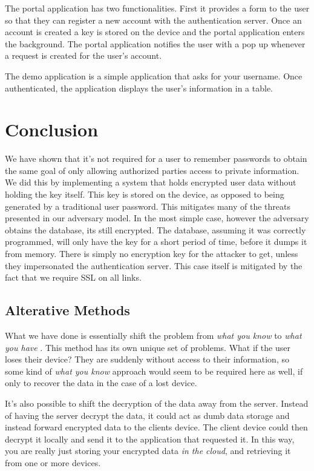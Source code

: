 \documentclass[letterpaper,twocolumn,10pt]{article}
\begin{document}
The portal application has two functionalities. First it provides a form to the user so that they can register a new account with the authentication server. Once an account is created a key is stored on the device and the portal application enters the background. The portal application notifies the user with a pop up whenever a request is created for the user's account.

The demo application is a simple application that asks for your username. Once authenticated, the application displays the user's information in a table. 


\section{Conclusion}
    We have shown that it's not required for a user to remember passwords to obtain the same goal of only allowing authorized parties access to private information. We did this by implementing a system that holds encrypted user data without holding the key itself. This key is stored on the device, as opposed to being generated by a traditional user password. This mitigates many of the threats presented in our adversary model. In the most simple case, however the adversary obtains the database, its still encrypted. The database, assuming it was correctly programmed, will only have the key for a short period of time, before it dumps it from memory. There is simply no encryption key for the attacker to get, unless they impersonated the authentication server. This case itself is mitigated by the fact that we require SSL on all links.

\subsection{Alterative Methods}

What we have done is essentially shift the problem from \textit{what you know} to \textit{what you have} \cite[Chapter~9]{privcomm}. This method has its own unique set of problems. What if the user loses their device? They are suddenly without access to their information, so some kind of \textit{what you know} approach would seem to be required here as well, if only to recover the data in the case of a lost device.

It's also possible to shift the decryption of the data away from the server. Instead of having the server decrypt the data, it could act as dumb data storage and instead forward encrypted data to the clients device. The client device could then decrypt it locally and send it to the application that requested it. In this way, you are really just storing your encrypted data \textit{in the cloud}, and retrieving it from one or more devices. 



{
    \small
    
    
}
\end{document}
